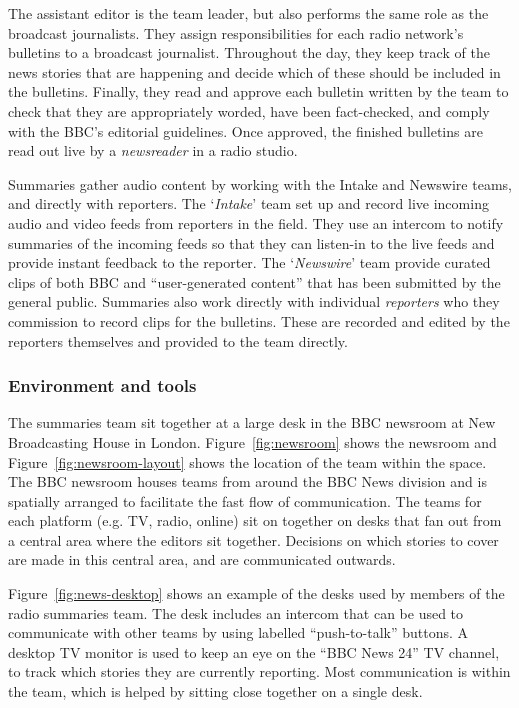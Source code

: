 The assistant editor is the team leader, but also performs the same role as the broadcast journalists. They assign responsibilities for each radio network's bulletins to a broadcast journalist. Throughout the day, they keep track of the news stories that are happening and decide which of these should be included in the bulletins. Finally, they read and approve each bulletin written by the team to check that they are appropriately worded, have been fact-checked, and comply with the BBC's editorial guidelines. Once approved, the finished bulletins are read out live by a \textit{newsreader} in a radio studio.

Summaries gather audio content by working with the Intake and Newswire teams, and directly with reporters. The `\textit{Intake}' team set up and record live incoming audio and video feeds from reporters in the field. They use an intercom to notify summaries of the incoming feeds so that they can listen-in to the live feeds and provide instant feedback to the reporter. The `\textit{Newswire}' team provide curated clips of both BBC and ``user-generated content'' that has been submitted by the general public. Summaries also work directly with individual \textit{reporters} who they commission to record clips for the bulletins. These are recorded and edited by the reporters themselves and provided to the team directly.

\subsubsection{Environment and tools}
The summaries team sit together at a large desk in the BBC newsroom at New Broadcasting House in London. Figure~\ref{fig:newsroom} shows the newsroom and Figure~\ref{fig:newsroom-layout} shows the location of the team within the space. The BBC newsroom houses teams from around the BBC News division and is spatially arranged to facilitate the fast flow of communication. The teams for each platform (e.g. TV, radio, online) sit on together on desks that fan out from a central area where the editors sit together. Decisions on which stories to cover are made in this central area, and are communicated outwards.

Figure~\ref{fig:news-desktop} shows an example of the desks used by members of the radio summaries team. The desk includes an intercom that can be used to communicate with other teams by using labelled ``push-to-talk'' buttons. A desktop TV monitor is used to keep an eye on the ``BBC News 24'' TV channel, to track which stories they are currently reporting. Most communication is within the team, which is helped by sitting close together on a single desk.

